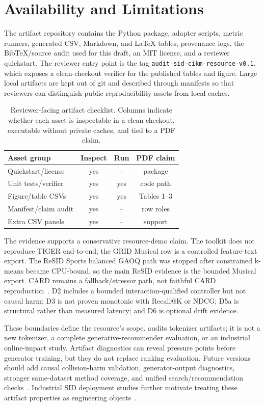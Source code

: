 \section{Availability and Limitations}

The artifact repository contains the \tool Python package, adapter scripts,
metric runners, generated CSV, Markdown, and \LaTeX{} tables, provenance logs,
the BibTeX/source audit used for this draft, an MIT license, and a reviewer
quickstart. The reviewer entry point is the tag
\texttt{audit-sid-cikm-resource-v0.1}, which exposes a clean-checkout verifier
for the published tables and figure. Large local artifacts are kept out of git
and described through manifests so that reviewers can distinguish public
reproducibility assets from local caches.

\begin{table}[t]
\caption{Reviewer-facing artifact checklist. Columns indicate whether each
asset is inspectable in a clean checkout, executable without private caches,
and tied to a PDF claim.}
\label{tab:artifact-package}
\small
\setlength{\tabcolsep}{3pt}
\begin{tabular}{@{}lccc@{}}
\toprule
Asset group & Inspect & Run & PDF claim \\
\midrule
Quickstart/license & yes & -- & package \\
Unit tests/verifier & yes & yes & code path \\
Figure/table CSVs & yes & yes & Tables 1--3 \\
Manifest/claim audit & yes & -- & row roles \\
Extra CSV panels & yes & -- & support \\
\bottomrule
\end{tabular}
\end{table}

The evidence supports a conservative resource-demo claim. The toolkit does not
reproduce TIGER end-to-end; the GRID Musical row is a controlled feature-text
export. The ReSID Sports balanced GAOQ path was stopped after constrained
k-means became CPU-bound, so the main ReSID evidence is the bounded Musical
export. CARD remains a fallback/stressor path, not faithful CARD
reproduction~\cite{wei2026card}. D2 includes a bounded interaction-qualified
controller but not causal harm; D3 is not proven monotonic with Recall@K or
NDCG; D5a is structural rather than measured latency; and D6 is optional drift
evidence.

These boundaries define the resource's scope. \tool audits tokenizer
artifacts; it is not a new \sid tokenizer, a complete
generative-recommender evaluation, or an industrial online-impact study.
Artifact diagnostics can reveal pressure points before generator training, but
they do not replace ranking evaluation. Future versions should add causal
collision-harm validation, generator-output diagnostics, stronger same-dataset
method coverage, and unified search/recommendation checks~\cite{penha2025jointsid}.
Industrial SID deployment studies further motivate treating these artifact
properties as engineering objects~\cite{ju2026snapchatsid}.


